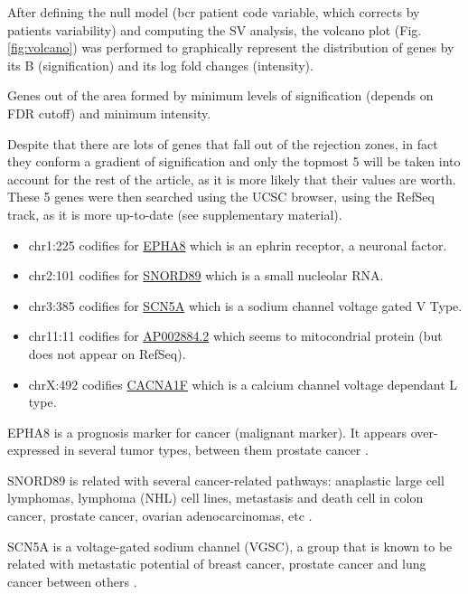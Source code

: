 \documentclass[9pt,twocolumn,twoside]{gsajnl}
\begin{document}
After defining the null model (bcr patient code variable, which corrects by patients variability) and computing the SV analysis, the volcano plot (Fig. \ref{fig:volcano}) was performed to graphically represent the distribution of genes by its B (signification) and its log fold changes (intensity).

Genes out of the area formed by minimum levels of signification (depends on FDR cutoff) and minimum intensity.


Despite that there are lots of genes that fall out of the rejection zones, in fact they conform a gradient of signification and only the topmost 5 will be taken into account for the rest of the article, as it is more likely that their values are worth. These 5 genes were then searched using the UCSC browser, using the RefSeq track, as it is more up-to-date (see supplementary material).

\begin{itemize}
\item chr1:225 codifies for \href{http://www.genecards.org/cgi-bin/carddisp.pl?gene=EPHA8}{EPHA8} which is an ephrin receptor, a neuronal factor.
\item chr2:101 codifies for \href{http://www.genecards.org/cgi-bin/carddisp.pl?gene=SNORD89}{SNORD89} which is a small nucleolar RNA.
\item chr3:385 codifies for \href{http://www.genecards.org/cgi-bin/carddisp.pl?gene=SCN5A}{SCN5A} which is a sodium channel voltage gated V Type.
\item chr11:11 codifies for \href{http://www.ensembl.org/Homo_sapiens/Gene/Summary?g=ENSG00000255292;r=11:112086903-112193805}{AP002884.2} which seems to mitocondrial protein (but does not appear on RefSeq).
\item chrX:492 codifies \href{http://www.genecards.org/cgi-bin/carddisp.pl?gene=CACNA1F}{CACNA1F} which is a calcium channel voltage dependant L type.
\end{itemize}

EPHA8 is a prognosis marker for cancer (malignant marker). It appears over-expressed in several tumor types, between them prostate cancer \cite{proteinatlas,uhlen2015tissue}.

SNORD89 is related with several cancer-related pathways:  anaplastic large cell lymphomas, lymphoma (NHL) cell lines, metastasis and death cell in colon cancer, prostate cancer, ovarian adenocarcinomas, etc \cite{tcng}.

SCN5A is a voltage-gated sodium channel (VGSC), a group that is known to be related with metastatic potential of breast cancer, prostate cancer and lung cancer between others \cite{Nelson2015}.
\end{document}
